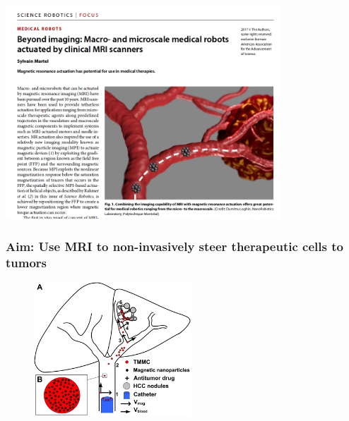 \documentclass[8pt,xcolor=table]{beamer}
\begin{document}
\begin{frame}
 
\includegraphics[height=8cm]{mrt_news}
 
\end{frame}

\begin{frame}
\frametitle{Aim: Use MRI to non-invasively steer therapeutic cells to tumors}



 \begin{figure}
 \centering
 \includegraphics[height=5cm]{steering}
 \end{figure}
 
\end{frame}
\end{document}
